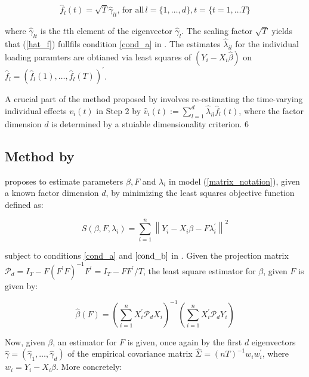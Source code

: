 \begin{equation}\label{hat_f}
    \hat{f}_l(t) = \sqrt{T} \hat{\gamma}_{lt}, \, \text{for all} \, l = \{1, \ldots, d\}, t = \{t = 1, \ldots T\}
\end{equation}

where $\hat{\gamma}_{lt}$ is the $t$th element of the eigenvector $\hat{\gamma}_l$. The scaling factor $\sqrt{T}$ yields that (\ref{hat_f}) fullfils condition \ref{cond_a} in . The estimates $\hat{\lambda}_{il}$ for the individual loading paramters are obtianed via least squares of $(Y_i - X_i \hat{\beta})$ on $\hat{f}_l = (\hat{f}_l(1), \ldots, \hat{f}_l(T))^\prime$.

A crucial part of the method proposed by \citet{kneip2012new} involves re-estimating the time-varying individual effects $v_i(t)$ in Step 2 by $\hat{v}_i(t) := \sum_{l=1}^d \hat{\lambda}_{il}  \hat{f}_l(t) $, where the factor dimension $d$ is determined by a  stuiable dimensionality criterion. 
6
\subsection{Method by \citet{bai2009panel}}
\citet{bai2009panel} proposes to estimate parameters $\beta, F$ and $\lambda_i$ in model (\ref{matrix_notation}), given a known factor dimension $d$,  by minimizing the least squares objective function defined as:

\begin{equation}
    S\left(\beta, F, \lambda_i\right)=\sum_{i=1}^n\left\|Y_i-X_i \beta-F \lambda_i^{\prime}\right\|^2
\end{equation}

subject to conditions \ref{cond_a} and $\ref{cond_b}$ in . Given the projection matrix $\mathcal{P}_d = I_T - F(F^\prime F)^{-1}F^\prime = I_T - FF^\prime/T$, the least square estimator for $\beta$, given $F$ is given by:

\begin{equation}
    \hat{\beta}(F)=\left(\sum_{i=1}^n X_i^{\prime} \mathcal{P}_d X_i\right)^{-1}\left(\sum_{i=1}^n X_i^{\prime} \mathcal{P}_d Y_i\right)
\end{equation}

Now, given $\beta$, an estimator for $F$ is given, once again by the first $d$ eigenvectors $\hat{\gamma} = (\hat{\gamma}_1, \ldots, \hat{\gamma}_d)$  of the empirical covariance matrix $\hat{\Sigma} = (nT)^{-1}w_i w_i^\prime$, where $w_i = Y_i - X_i \beta$. More concretely:

